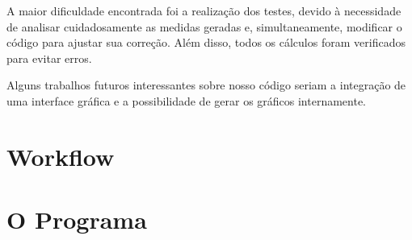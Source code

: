 \documentclass[a4paper,12pt]{report}
\begin{document}
A maior dificuldade encontrada foi a realização dos testes, devido à necessidade de analisar cuidadosamente as medidas geradas e, simultaneamente, modificar o código para ajustar sua correção. Além disso, todos os cálculos foram verificados para evitar erros.

Alguns trabalhos futuros interessantes sobre nosso código seriam a integração de uma interface gráfica e a possibilidade de gerar os gráficos internamente.

\appendix
\chapter{Workflow}

\newpage

\appendix
\chapter{O Programa}
\end{document}
